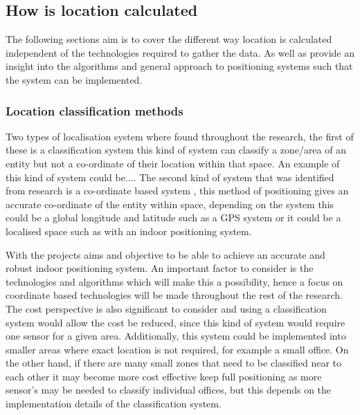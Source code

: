 \subsection{How is location calculated}
The following sections aim is to cover the different way location is calculated independent of the technologies required to gather the data. As well as provide an insight into the algorithms and general approach to positioning systems such that the system can be implemented. 

\subsubsection{Location classification methods}
Two types of localisation system where found throughout the research, the first of these is a classification system \citetemp this kind of system can classify a zone/area of an entity but not a co-ordinate of their location within that space. An example of this kind of system could be....
The second kind of system that was identified from research is a co-ordinate based system \citetemp, this method of positioning gives an accurate co-ordinate of the entity within space, depending on the system this could be a global longitude and latitude such as a GPS system or it could be a localised space such as with an indoor positioning system.

With the projects aims and objective to be able to achieve an accurate and robust indoor positioning system. An important factor to consider is the technologies and algorithms which will make this a possibility, hence a focus on coordinate based technologies will be made throughout the rest of the research. The cost perspective is also significant to consider and using a classification system would allow the cost be reduced, since this kind of system would require one sensor for a given area. Additionally, this system could be implemented into smaller areas where exact location is not required, for example a small office. On the other hand, if there are many small zones that need to be classified near to each other it may become more cost effective keep full positioning as more sensor's may be needed to classify individual offices, but this depends on the implementation details of the classification system.  

